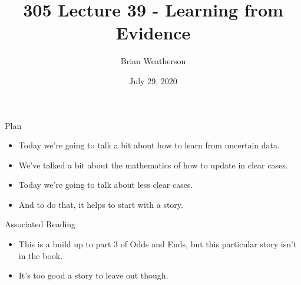 \documentclass[
  ignorenonframetext,
]{beamer}
\title{305 Lecture 39 - Learning from Evidence}
\author{Brian Weatherson}
\date{July 29, 2020}
\providecommand{\tightlist}{%
  \setlength{\itemsep}{0pt}\setlength{\parskip}{0pt}}
\renewcommand{\,}{\text{, }}
\begin{document}
\frame{\titlepage}

\begin{frame}{Plan}
\protect\hypertarget{plan}{}

\begin{itemize}
\tightlist
\item
  Today we're going to talk a bit about how to learn from uncertain
  data.
\item
  We've talked a bit about the mathematics of how to update in clear
  cases.
\item
  Today we're going to talk about less clear cases.
\item
  And to do that, it helps to start with a story.
\end{itemize}

\end{frame}

\begin{frame}{Associated Reading}
\protect\hypertarget{associated-reading}{}

\begin{itemize}
\tightlist
\item
  This is a build up to part 3 of Odds and Ends, but this particular
  story isn't in the book.
\item
  It's too good a story to leave out though.
\end{itemize}

\end{frame}
\end{document}
